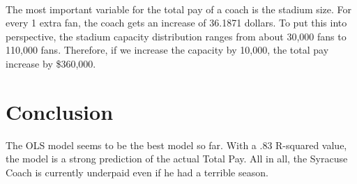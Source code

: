 \documentclass[11pt]{article}
\begin{document}
    \begin{center}
    \end{center}
    { \hspace*{\fill} \\}
    
    The most important variable for the total pay of a coach is the stadium
size. For every 1 extra fan, the coach gets an increase of 36.1871
dollars. To put this into perspective, the stadium capacity distribution
ranges from about 30,000 fans to 110,000 fans. Therefore, if we increase
the capacity by 10,000, the total pay increase by \$360,000.

    \section{Conclusion}\label{conclusion}

    The OLS model seems to be the best model so far. With a .83 R-squared
value, the model is a strong prediction of the actual Total Pay. All in
all, the Syracuse Coach is currently underpaid even if he had a terrible
season.


    
    
    
    
\end{document}
